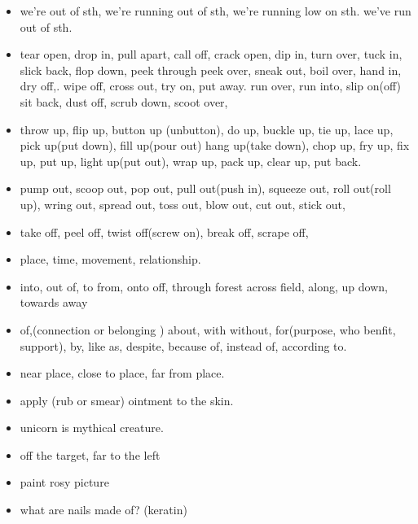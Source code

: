 \documentclass[a4paper,11pt,twoside]{book}
\begin{document}
	
	
\begin{itemize}
	\item we're out of sth, we're running out of sth, we're running low on sth. we've run out of sth. 


	\item tear open, drop in, pull apart, call off, crack open, dip in, turn over, tuck in, slick back, flop down, peek through
	peek over, sneak out, boil over, hand in, dry off,. wipe off, cross out, try on, put away. run over, run into, slip on(off)
	sit back, dust off, scrub down, scoot over, 
	
	\item throw up, flip up, button up (unbutton), do up, buckle up, tie up, lace up, pick up(put down), fill up(pour out)
	hang up(take down), chop up, fry up, fix up, put up, light up(put out), wrap up, pack up, clear up, put back. 
	
	\item pump out, scoop out, pop out, pull out(push in), squeeze out, roll out(roll up), wring out, spread out, toss out, blow out, cut out, stick out, 
	
	\item take off, peel off, twist off(screw on), break off,  scrape off, 
	
	\item place, time, movement, relationship. 
	
	\item into, out of, to from, onto off, through forest across field, along, up down, towards away
	
	\item of,(connection or belonging ) about, with without, for(purpose, who benfit,  support), by,  like as, despite, because of, instead of, according to.

	\item near place, close to place, far from place.

	\item apply (rub or smear) ointment to the skin. 

	\item unicorn is mythical creature.
	
	\item off the target, far to the left 

	\item paint rosy picture
	
	\item what are nails made of? (keratin)
	

\end{itemize}
\end{document}
